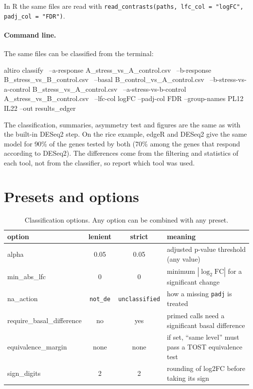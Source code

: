 \documentclass[11pt,a4paper]{article}
\newcommand{\code}[1]{\texttt{\color{navy!85!black}#1}}
\begin{document}
In R the same files are read with \code{read\_contrasts(paths, lfc\_col = "logFC", padj\_col = "FDR")}.

\paragraph{Command line.} The same files can be classified from the terminal:

\begin{shcode}
altiro classify \
  --a-response            A_stress_vs_A_control.csv \
  --b-response            B_stress_vs_B_control.csv \
  --basal                 B_control_vs_A_control.csv \
  --b-stress-vs-a-control B_stress_vs_A_control.csv \
  --a-stress-vs-b-control A_stress_vs_B_control.csv \
  --lfc-col logFC --padj-col FDR --group-names PL12 IL22 --out results_edger
\end{shcode}

The classification, summaries, asymmetry test and figures are the same as with the built-in DESeq2
step. On the rice example, edgeR and DESeq2 give the same model for 90\% of the genes tested by both
(70\% among the genes that respond according to DESeq2). The differences come from the filtering and
statistics of each tool, not from the classifier, so report which tool was used.

\section{Presets and options}
\label{sec:options}

\begin{table}[htbp]
\centering\small
\caption{Classification options. Any option can be combined with any preset.}
\begin{tabularx}{\linewidth}{>{\ttfamily\color{navy!85!black}}l c c Y}
\toprule
\textsf{\textbf{option}} & \textsf{\textbf{lenient}} & \textsf{\textbf{strict}} & \textsf{\textbf{meaning}}\\
\midrule
alpha & 0.05 & 0.05 & adjusted p-value threshold (any value)\\
min\_abs\_lfc & 0 & 0 & minimum \(|\log_2\mathrm{FC}|\) for a significant change\\
na\_action & \code{not\_de} & \code{unclassified} & how a missing \code{padj} is treated\\
require\_basal\_difference & no & yes & primed calls need a significant basal difference\\
equivalence\_margin & none & none & if set, ``same level'' must pass a TOST equivalence test\\
sign\_digits & 2 & 2 & rounding of log2FC before taking its sign\\
\bottomrule
\end{tabularx}
\end{table}
\end{document}
